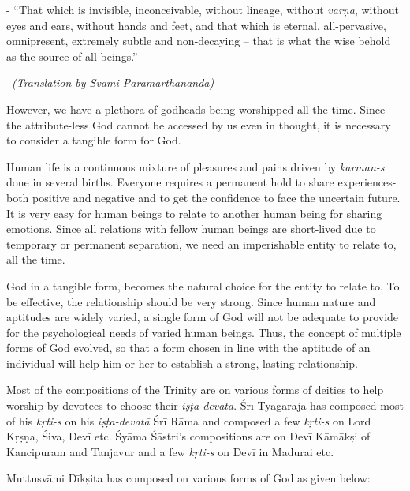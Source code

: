 \begin{myquote}
- ``That which is invisible, inconceivable, without lineage, without \textit{varṇa}, without eyes and ears, without hands and feet, and that which is eternal, all-pervasive, omnipresent, extremely subtle and non-decaying – that is what the wise behold as the source of all beings.” 

~\hfill \textit{(Translation by Svami Paramarthananda)}
\end{myquote}

However, we have a plethora of godheads being worshipped all the time. Since the attribute-less God cannot be accessed by us even in thought, it is necessary to consider a tangible form for God.

Human life is a continuous mixture of pleasures and pains driven by \textit{karman-s} done in several births. Everyone requires a permanent hold to share experiences- both positive and negative and to get the confidence to face the uncertain future. It is very easy for human beings to relate to another human being for sharing emotions. Since all relations with fellow human beings are short-lived due to temporary or permanent separation, we need an imperishable entity to relate to, all the time.

God in a tangible form, becomes the natural choice for the entity to relate to. To be effective, the relationship should be very strong. Since human nature and aptitudes are widely varied, a single form of God will not be adequate to provide for the psychological needs of varied human beings. Thus, the concept of multiple forms of God evolved, so that a form chosen in line with the aptitude of an individual will help him or her to establish a strong, lasting relationship.

Most of the compositions of the Trinity are on various forms of deities to help worship by devotees to choose their \textit{iṣṭa-devatā}. Śrī Tyāgarāja has composed most of his \textit{kṛti-s} on his \textit{iṣṭa-devatā} Śrī Rāma and composed a few \textit{kṛti-s} on Lord Kṛṣṇa, Śiva, Devī etc. Śyāma Śāstri’s compositions are on Devī Kāmākṣi of Kancipuram and Tanjavur and a few \textit{kṛti-s} on Devī in Madurai etc.

Muttusvāmi Dīkṣita has composed on various forms of God as given below:

